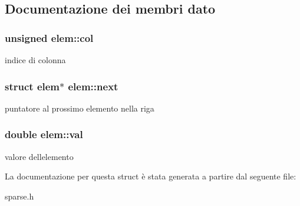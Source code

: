 \subsection{Documentazione dei membri dato}
\subsubsection[{\texorpdfstring{col}{col}}]{\setlength{\rightskip}{0pt plus 5cm}unsigned elem\+::col}\hypertarget{structelem_aca409f3a7c1c9621b262a230c78ef37b}{}\label{structelem_aca409f3a7c1c9621b262a230c78ef37b}
indice di colonna 
\subsubsection[{\texorpdfstring{next}{next}}]{\setlength{\rightskip}{0pt plus 5cm}struct {\bf elem}$\ast$ elem\+::next}\hypertarget{structelem_ab9cf5c2e1c9a0ec2938275b90d39d5ca}{}\label{structelem_ab9cf5c2e1c9a0ec2938275b90d39d5ca}
puntatore al prossimo elemento nella riga 
\subsubsection[{\texorpdfstring{val}{val}}]{\setlength{\rightskip}{0pt plus 5cm}double elem\+::val}\hypertarget{structelem_a52a0b099052bdf7611aa32acdb3f5449}{}\label{structelem_a52a0b099052bdf7611aa32acdb3f5449}
valore dell\textquotesingle{}elemento 

La documentazione per questa struct è stata generata a partire dal seguente file\+:\begin{DoxyCompactItemize}
\item 
sparse.\+h\end{DoxyCompactItemize}

